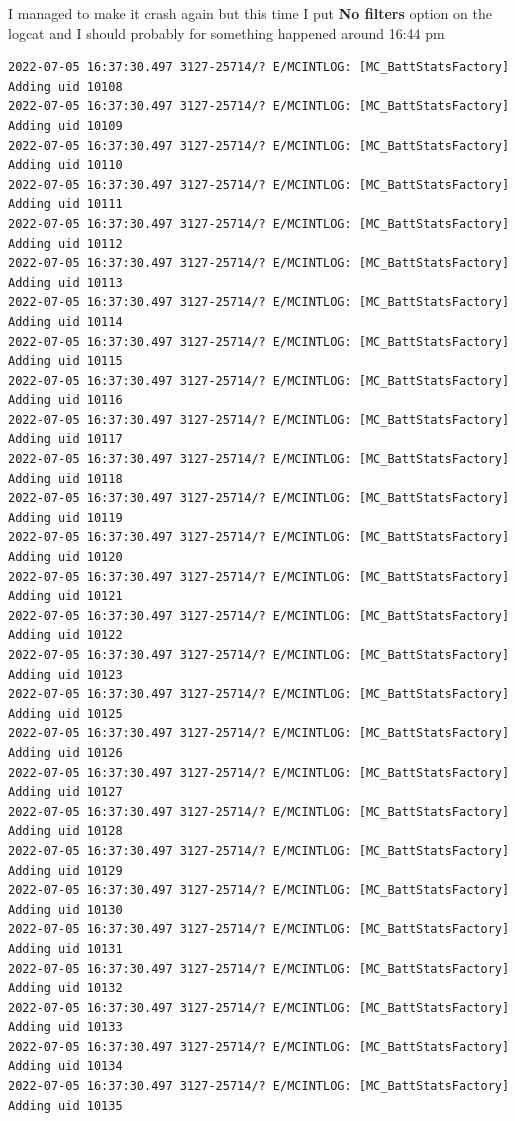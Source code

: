 \documentclass[a4paper,12pt]{book}
\begin{document}
I managed to make it crash again but this time I put \textbf{No filters} option on the logcat and I should probably for something happened around 16:44 pm

\begin{lstlisting}
2022-07-05 16:37:30.497 3127-25714/? E/MCINTLOG: [MC_BattStatsFactory] Adding uid 10108
2022-07-05 16:37:30.497 3127-25714/? E/MCINTLOG: [MC_BattStatsFactory] Adding uid 10109
2022-07-05 16:37:30.497 3127-25714/? E/MCINTLOG: [MC_BattStatsFactory] Adding uid 10110
2022-07-05 16:37:30.497 3127-25714/? E/MCINTLOG: [MC_BattStatsFactory] Adding uid 10111
2022-07-05 16:37:30.497 3127-25714/? E/MCINTLOG: [MC_BattStatsFactory] Adding uid 10112
2022-07-05 16:37:30.497 3127-25714/? E/MCINTLOG: [MC_BattStatsFactory] Adding uid 10113
2022-07-05 16:37:30.497 3127-25714/? E/MCINTLOG: [MC_BattStatsFactory] Adding uid 10114
2022-07-05 16:37:30.497 3127-25714/? E/MCINTLOG: [MC_BattStatsFactory] Adding uid 10115
2022-07-05 16:37:30.497 3127-25714/? E/MCINTLOG: [MC_BattStatsFactory] Adding uid 10116
2022-07-05 16:37:30.497 3127-25714/? E/MCINTLOG: [MC_BattStatsFactory] Adding uid 10117
2022-07-05 16:37:30.497 3127-25714/? E/MCINTLOG: [MC_BattStatsFactory] Adding uid 10118
2022-07-05 16:37:30.497 3127-25714/? E/MCINTLOG: [MC_BattStatsFactory] Adding uid 10119
2022-07-05 16:37:30.497 3127-25714/? E/MCINTLOG: [MC_BattStatsFactory] Adding uid 10120
2022-07-05 16:37:30.497 3127-25714/? E/MCINTLOG: [MC_BattStatsFactory] Adding uid 10121
2022-07-05 16:37:30.497 3127-25714/? E/MCINTLOG: [MC_BattStatsFactory] Adding uid 10122
2022-07-05 16:37:30.497 3127-25714/? E/MCINTLOG: [MC_BattStatsFactory] Adding uid 10123
2022-07-05 16:37:30.497 3127-25714/? E/MCINTLOG: [MC_BattStatsFactory] Adding uid 10125
2022-07-05 16:37:30.497 3127-25714/? E/MCINTLOG: [MC_BattStatsFactory] Adding uid 10126
2022-07-05 16:37:30.497 3127-25714/? E/MCINTLOG: [MC_BattStatsFactory] Adding uid 10127
2022-07-05 16:37:30.497 3127-25714/? E/MCINTLOG: [MC_BattStatsFactory] Adding uid 10128
2022-07-05 16:37:30.497 3127-25714/? E/MCINTLOG: [MC_BattStatsFactory] Adding uid 10129
2022-07-05 16:37:30.497 3127-25714/? E/MCINTLOG: [MC_BattStatsFactory] Adding uid 10130
2022-07-05 16:37:30.497 3127-25714/? E/MCINTLOG: [MC_BattStatsFactory] Adding uid 10131
2022-07-05 16:37:30.497 3127-25714/? E/MCINTLOG: [MC_BattStatsFactory] Adding uid 10132
2022-07-05 16:37:30.497 3127-25714/? E/MCINTLOG: [MC_BattStatsFactory] Adding uid 10133
2022-07-05 16:37:30.497 3127-25714/? E/MCINTLOG: [MC_BattStatsFactory] Adding uid 10134
2022-07-05 16:37:30.497 3127-25714/? E/MCINTLOG: [MC_BattStatsFactory] Adding uid 10135

\end{lstlisting}
\end{document}
